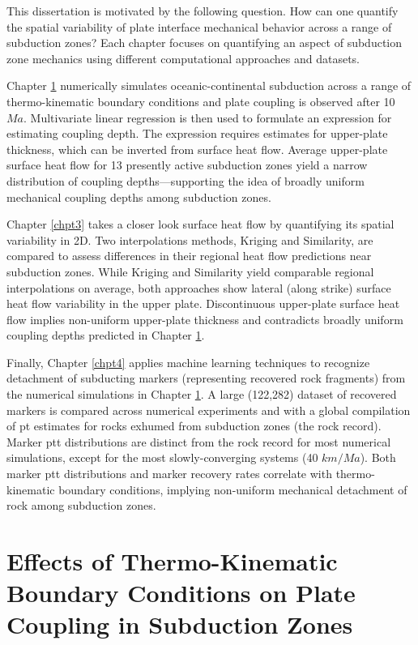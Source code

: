This dissertation is motivated by the following question. How can one quantify the spatial variability of plate interface mechanical behavior across a range of subduction zones? Each chapter focuses on quantifying an aspect of subduction zone mechanics using different computational approaches and datasets.

Chapter \ref{chpt2} numerically simulates oceanic-continental subduction across a range of thermo-kinematic boundary conditions and plate coupling is observed after 10 \(Ma\). Multivariate linear regression is then used to formulate an expression for estimating coupling depth. The expression requires estimates for upper-plate thickness, which can be inverted from surface heat flow. Average upper-plate surface heat flow for 13 presently active subduction zones yield a narrow distribution of coupling depths---supporting the idea of broadly uniform mechanical coupling depths among subduction zones.

Chapter \ref{chpt3} takes a closer look surface heat flow by quantifying its spatial variability in 2D. Two interpolations methods, Kriging and Similarity, are compared to assess differences in their regional heat flow predictions near subduction zones. While Kriging and Similarity yield comparable regional interpolations on average, both approaches show lateral (along strike) surface heat flow variability in the upper plate. Discontinuous upper-plate surface heat flow implies non-uniform upper-plate thickness and contradicts broadly uniform coupling depths predicted in Chapter \ref{chpt2}.

Finally, Chapter \ref{chpt4} applies machine learning techniques to recognize detachment of subducting markers (representing recovered rock fragments) from the numerical simulations in Chapter \ref{chpt2}. A large (122,282)  dataset of recovered markers is compared across numerical experiments and with a global compilation of \gls{pt} estimates for rocks exhumed from subduction zones (the rock record). Marker \gls{ptt} distributions are distinct from the rock record for most numerical simulations, except for the most slowly-converging systems (40 \(km/Ma\)). Both marker \gls{ptt} distributions and marker recovery rates correlate with thermo-kinematic boundary conditions, implying non-uniform mechanical detachment of rock among subduction zones.

\cleardoublepage

\hypertarget{chpt2}{%
\chapter{Effects of Thermo-Kinematic Boundary Conditions on Plate Coupling in Subduction Zones}\label{chpt2}}

